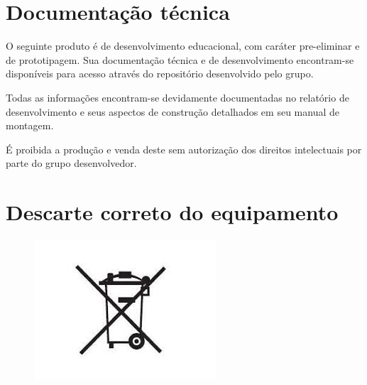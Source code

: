 \section*{Documentação técnica}

\par O seguinte produto é de desenvolvimento educacional, com caráter pre-eliminar e de prototipagem. Sua documentação técnica e de desenvolvimento encontram-se disponíveis para acesso através do repositório desenvolvido pelo grupo. 

\par Todas as informações encontram-se devidamente documentadas no relatório de desenvolvimento e seus aspectos de construção detalhados em seu manual de montagem.

\par É proibida a produção e venda deste sem autorização dos direitos intelectuais por parte do grupo desenvolvedor.

\section*{Descarte correto do equipamento}

    \begin{figure}[H]
    \centering
		\includegraphics[scale=1]{Figuras/lixo.jpg}
    \end{figure} 
    
